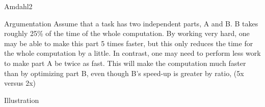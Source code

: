 %
\begin{Frame}{Amdahl2}
      \begin{block}{Argumentation}
        Assume that a task has two independent parts, A and B. B takes
        roughly 25\% of the time of the whole computation. By working
        very hard, one may be able to make this part 5 times faster,
        but this only reduces the time for the whole computation by a
        little. In contrast, one may need to perform less work to make
        part A be twice as fast. This will make the computation much
        faster than by optimizing part B, even though B's speed-up is
        greater by ratio, (5x versus 2x)
      \end{block} 
      \begin{block}{Illustration}
      \end{block}   
\end{Frame}


